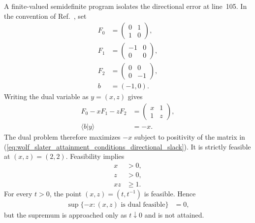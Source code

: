 \documentclass{article}
\begin{document}
A finite-valued semidefinite program isolates the directional error at
line~105. In the convention of Ref.~\cite{Wolf2012Quantum}, set
\begin{align}
  F_0
    &=\begin{pmatrix}0&1\\1&0\end{pmatrix},
  \label{eq:wolf_slater_attainment_conditions_directional_F0}\\
  F_1
    &=\begin{pmatrix}-1&0\\0&0\end{pmatrix},
  \label{eq:wolf_slater_attainment_conditions_directional_F1}\\
  F_2
    &=\begin{pmatrix}0&0\\0&-1\end{pmatrix},
  \label{eq:wolf_slater_attainment_conditions_directional_F2}\\
  b
    &=(-1,0).
  \label{eq:wolf_slater_attainment_conditions_directional_b}
\end{align}
Writing the dual variable as $y=(x,z)$ gives
\begin{align}
  F_0-xF_1-zF_2
    &=\begin{pmatrix}x&1\\1&z\end{pmatrix},
  \label{eq:wolf_slater_attainment_conditions_directional_slack}\\
  \langle b|y\rangle
    &=-x.
  \label{eq:wolf_slater_attainment_conditions_directional_objective}
\end{align}
The dual problem therefore maximizes $-x$ subject to positivity of the matrix
in (\ref{eq:wolf_slater_attainment_conditions_directional_slack}). It is
strictly feasible at $(x,z)=(2,2)$. Feasibility implies
\begin{align}
  x
    &>0,
  \label{eq:wolf_slater_attainment_conditions_directional_x_positive}\\
  z
    &>0,
  \label{eq:wolf_slater_attainment_conditions_directional_z_positive}\\
  xz
    &\geq1.
  \label{eq:wolf_slater_attainment_conditions_directional_determinant}
\end{align}
For every $t>0$, the point $(x,z)=(t,t^{-1})$ is feasible. Hence
\begin{align}
  \sup\{-x:(x,z)\text{ is dual feasible}\}
    &=0,
  \label{eq:wolf_slater_attainment_conditions_unattained_dual_supremum}
\end{align}
but the supremum is approached only as $t\downarrow0$ and is not attained.
\end{document}
